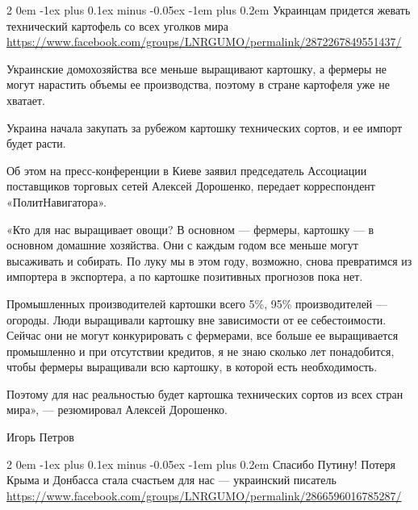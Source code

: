 \documentclass[a4paper,11pt]{extreport}
\makeatletter
\renewcommand\subsection{%
  \clearpage
    \@startsection{subsection}%
    {2}%
    {0em}%
    {-1ex plus 0.1ex minus -0.05ex}%
    {-1em plus 0.2em}%
    {\scshape\bfseries\Large}%
}
\makeatother
\begin{document}

\subsection{Украинцам придется жевать технический картофель со всех уголков мира}
\label{sec:24_07_2020.fb.lnr.5}
\url{https://www.facebook.com/groups/LNRGUMO/permalink/2872267849551437/}


Украинские домохозяйства все меньше выращивают картошку, а фермеры не могут
нарастить объемы ее производства, поэтому в стране картофеля уже не хватает.

Украина начала закупать за рубежом картошку технических сортов, и ее импорт
будет расти.

Об этом на пресс-конференции в Киеве заявил председатель Ассоциации поставщиков
торговых сетей Алексей Дорошенко, передает корреспондент «ПолитНавигатора».

«Кто для нас выращивает овощи? В основном --- фермеры, картошку --- в основном
домашние хозяйства. Они с каждым годом все меньше могут высаживать и собирать.
По луку мы в этом году, возможно, снова превратимся из импортера в экспортера,
а по картошке позитивных прогнозов пока нет.

Промышленных производителей картошки всего 5\%, 95\% производителей --- огороды.
Люди выращивали картошку вне зависимости от ее себестоимости. Сейчас они не
могут конкурировать с фермерами, все больше ее выращивается промышленно и при
отсутствии кредитов, я не знаю сколько лет понадобится, чтобы фермеры
выращивали всю картошку, в которой есть необходимость.

Поэтому для нас реальностью будет картошка технических сортов из всех стран
мира», --- резюмировал Алексей Дорошенко.

Игорь Петров
  
 
 
\subsection{Спасибо Путину! Потеря Крыма и Донбасса стала счастьем для нас --- украинский писатель}
\label{sec:24_07_2020.fb.lnr.6}
\url{https://www.facebook.com/groups/LNRGUMO/permalink/2866596016785287/}
\end{document}
